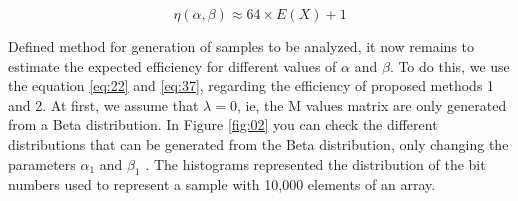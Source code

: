 \documentclass[10pt]{article}
\begin{document}
\begin{equation}\label{eq:55}
  \eta(\alpha,\beta) \approx 64 \times E(X) + 1
\end{equation}
 
Defined method for generation of samples to be analyzed, it now remains to estimate the expected efficiency for different values ​​of $\alpha$ and $\beta$. To do this, we use the equation \ref{eq:22} and \ref{eq:37}, regarding the efficiency of proposed methods 1 and 2. At first, we assume that $\lambda=0$, ie, the M values matrix  are only generated from a Beta distribution. In Figure \ref{fig:02} you can check the different distributions that can be generated from the Beta distribution, only changing the parameters $\alpha_1$ and $\beta_1$ . The histograms represented the distribution of the bit numbers used to represent a sample with 10,000 elements of an array. 
\end{document}
